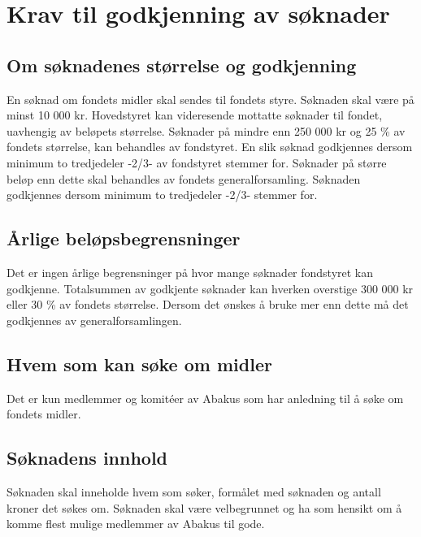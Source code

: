\section{Krav til godkjenning av søknader}
\subsection{Om søknadenes størrelse og godkjenning}
En søknad om fondets midler skal sendes til fondets styre. Søknaden skal være
på minst 10 000 kr. Hovedstyret kan videresende mottatte søknader til fondet,
uavhengig av beløpets størrelse. Søknader på mindre enn 250 000 kr og 25 \% av
fondets størrelse, kan behandles av fondstyret. En slik søknad godkjennes
dersom minimum to tredjedeler -2/3- av fondstyret stemmer for. Søknader på
større beløp enn dette skal behandles av fondets generalforsamling. Søknaden
godkjennes dersom minimum to tredjedeler -2/3- stemmer for. 

\subsection{Årlige beløpsbegrensninger}
Det er ingen årlige begrensninger på hvor mange søknader fondstyret kan
godkjenne. Totalsummen av godkjente søknader kan hverken overstige 300 000 kr
eller 30 \% av fondets størrelse. Dersom det ønskes å bruke mer enn dette må
det godkjennes av generalforsamlingen.

\subsection{Hvem som kan søke om midler}
Det er kun medlemmer og komitéer av Abakus som har anledning til å søke om
fondets midler. 

\subsection{Søknadens innhold}
Søknaden skal inneholde hvem som søker, formålet med søknaden og antall kroner
det søkes om. Søknaden skal være velbegrunnet og ha som hensikt om å komme
flest mulige medlemmer av Abakus til gode. 
